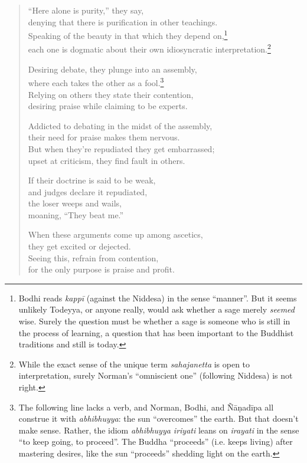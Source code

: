 \documentclass[12pt,openany]{book}%
\begin{document}
\begin{verse}%
“Here alone is purity,” they say, \\
denying that there is purification in other teachings. \\
Speaking of the beauty in that which they depend on,\footnote{Bodhi reads \textit{\textsanskrit{kappī}} (against the Niddesa) in the sense “manner”. But it seems unlikely Todeyya, or anyone really, would ask whether a sage merely \emph{seemed} wise. Surely the question must be whether a sage is someone who is still in the process of learning, a question that has been important to the Buddhist traditions and still is today. } \\
each one is dogmatic about their own idiosyncratic interpretation.\footnote{While the exact sense of the unique term \textit{sahajanetta} is open to interpretation, surely Norman’s “omniscient one” (following Niddesa) is not right. } 

Desiring debate, they plunge into an assembly, \\
where each takes the other as a fool.\footnote{The following line lacks a verb, and Norman, Bodhi, and \textsanskrit{Ñāṇadīpa} all construe it with \textit{abhibhuyya}: the sun “overcomes” the earth. But that doesn’t make sense. Rather, the idiom \textit{abhibhuyya iriyati} leans on \textit{irayati} in the sense “to keep going, to proceed”. The Buddha “proceeds” (i.e. keeps living) after mastering desires, like the sun “proceeds” shedding light on the earth. } \\
Relying on others they state their contention, \\
desiring praise while claiming to be experts. 

Addicted to debating in the midst of the assembly, \\
their need for praise makes them nervous. \\
But when they’re repudiated they get embarrassed; \\
upset at criticism, they find fault in others. 

If their doctrine is said to be weak, \\
and judges declare it repudiated, \\
the loser weeps and wails, \\
moaning, “They beat me.” 

When these arguments come up among ascetics, \\
they get excited or dejected. \\
Seeing this, refrain from contention, \\
for the only purpose is praise and profit. 


\end{verse}
\end{document}
